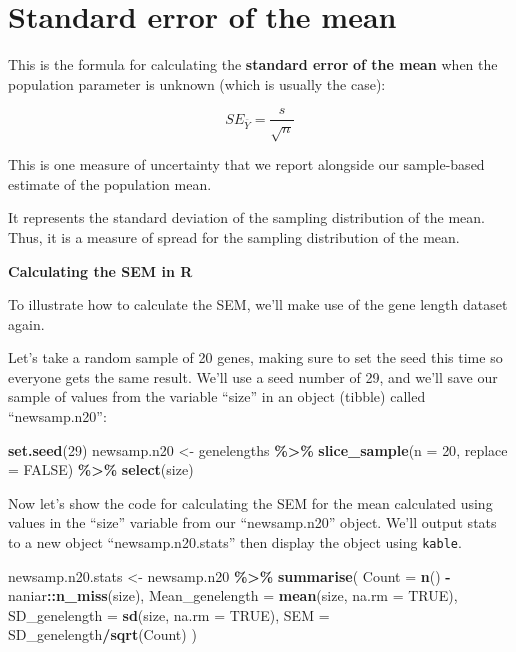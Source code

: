 \documentclass[
]{book}
\newenvironment{Shaded}{\begin{snugshade}}{\end{snugshade}}
\newcommand{\AttributeTok}[1]{\textcolor[rgb]{0.13,0.29,0.53}{#1}}
\newcommand{\ConstantTok}[1]{\textcolor[rgb]{0.56,0.35,0.01}{#1}}
\newcommand{\DecValTok}[1]{\textcolor[rgb]{0.00,0.00,0.81}{#1}}
\newcommand{\FunctionTok}[1]{\textcolor[rgb]{0.13,0.29,0.53}{\textbf{#1}}}
\newcommand{\NormalTok}[1]{#1}
\newcommand{\OtherTok}[1]{\textcolor[rgb]{0.56,0.35,0.01}{#1}}
\newcommand{\SpecialCharTok}[1]{\textcolor[rgb]{0.81,0.36,0.00}{\textbf{#1}}}
\begin{document}
\section{Standard error of the mean}\label{sem_page}

This is the formula for calculating the \textbf{standard error} \textbf{of the mean} when the population parameter is unknown (which is usually the case):

\[SE_\bar{Y} = \frac{s}{\sqrt{n}}\]

This is one measure of uncertainty that we report alongside our sample-based estimate of the population mean.

It represents the standard deviation of the sampling distribution of the mean. Thus, it is a measure of spread for the sampling distribution of the mean.

\textbf{Calculating the SEM in R}

To illustrate how to calculate the SEM, we'll make use of the gene length dataset again.

Let's take a random sample of 20 genes, making sure to set the seed this time so everyone gets the same result. We'll use a seed number of 29, and we'll save our sample of values from the variable ``size'' in an object (tibble) called ``newsamp.n20'':

\begin{Shaded}
\begin{Highlighting}[]
\FunctionTok{set.seed}\NormalTok{(}\DecValTok{29}\NormalTok{)}
\NormalTok{newsamp.n20 }\OtherTok{\textless{}{-}}\NormalTok{ genelengths }\SpecialCharTok{\%\textgreater{}\%}
  \FunctionTok{slice\_sample}\NormalTok{(}\AttributeTok{n =} \DecValTok{20}\NormalTok{, }\AttributeTok{replace =} \ConstantTok{FALSE}\NormalTok{) }\SpecialCharTok{\%\textgreater{}\%}
  \FunctionTok{select}\NormalTok{(size)}
\end{Highlighting}
\end{Shaded}

Now let's show the code for calculating the SEM for the mean calculated using values in the ``size'' variable from our ``newsamp.n20'' object. We'll output stats to a new object ``newsamp.n20.stats'' then display the object using \texttt{kable}.

\begin{Shaded}
\begin{Highlighting}[]
\NormalTok{newsamp.n20.stats }\OtherTok{\textless{}{-}}\NormalTok{ newsamp.n20 }\SpecialCharTok{\%\textgreater{}\%}
  \FunctionTok{summarise}\NormalTok{(}
    \AttributeTok{Count =} \FunctionTok{n}\NormalTok{() }\SpecialCharTok{{-}}\NormalTok{ naniar}\SpecialCharTok{::}\FunctionTok{n\_miss}\NormalTok{(size),}
    \AttributeTok{Mean\_genelength =} \FunctionTok{mean}\NormalTok{(size, }\AttributeTok{na.rm =} \ConstantTok{TRUE}\NormalTok{),}
    \AttributeTok{SD\_genelength =} \FunctionTok{sd}\NormalTok{(size, }\AttributeTok{na.rm =} \ConstantTok{TRUE}\NormalTok{),}
    \AttributeTok{SEM =}\NormalTok{ SD\_genelength}\SpecialCharTok{/}\FunctionTok{sqrt}\NormalTok{(Count)}
\NormalTok{  )}
\end{Highlighting}
\end{Shaded}
\end{document}

